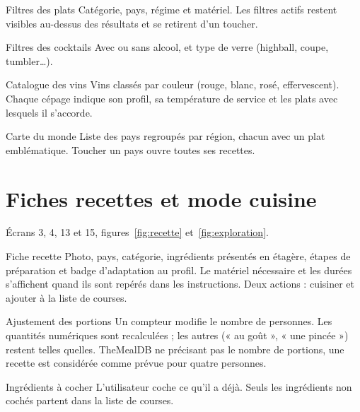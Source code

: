 \begin{exigence}[priorite=haute]{Filtres des plats}
  Catégorie, pays, régime et matériel. Les filtres actifs restent visibles
  au-dessus des résultats et se retirent d'un toucher.
\end{exigence}

\begin{exigence}[priorite=moyenne]{Filtres des cocktails}
  Avec ou sans alcool, et type de verre (highball, coupe, tumbler…).
\end{exigence}

\begin{exigence}[priorite=moyenne]{Catalogue des vins}
  Vins classés par couleur (rouge, blanc, rosé, effervescent). Chaque cépage
  indique son profil, sa température de service et les plats avec lesquels
  il s'accorde.
\end{exigence}

\begin{exigence}[priorite=moyenne]{Carte du monde}
  Liste des pays regroupés par région, chacun avec un plat emblématique.
  Toucher un pays ouvre toutes ses recettes.
\end{exigence}

\section{Fiches recettes et mode cuisine}

Écrans 3, 4, 13 et 15, figures~\ref{fig:recette} et~\ref{fig:exploration}.

\begin{exigence}[priorite=haute]{Fiche recette}
  Photo, pays, catégorie, ingrédients présentés en étagère, étapes de
  préparation et badge d'adaptation au profil. Le matériel nécessaire et
  les durées s'affichent quand ils sont repérés dans les instructions. Deux
  actions : cuisiner et ajouter à la liste de courses.
\end{exigence}

\begin{exigence}[priorite=moyenne]{Ajustement des portions}
  Un compteur modifie le nombre de personnes. Les quantités numériques sont
  recalculées ; les autres (« au goût », « une pincée ») restent telles
  quelles. TheMealDB ne précisant pas le nombre de portions, une recette est
  considérée comme prévue pour quatre personnes.
\end{exigence}

\begin{exigence}[priorite=moyenne]{Ingrédients à cocher}
  L'utilisateur coche ce qu'il a déjà. Seuls les ingrédients non cochés
  partent dans la liste de courses.
\end{exigence}

